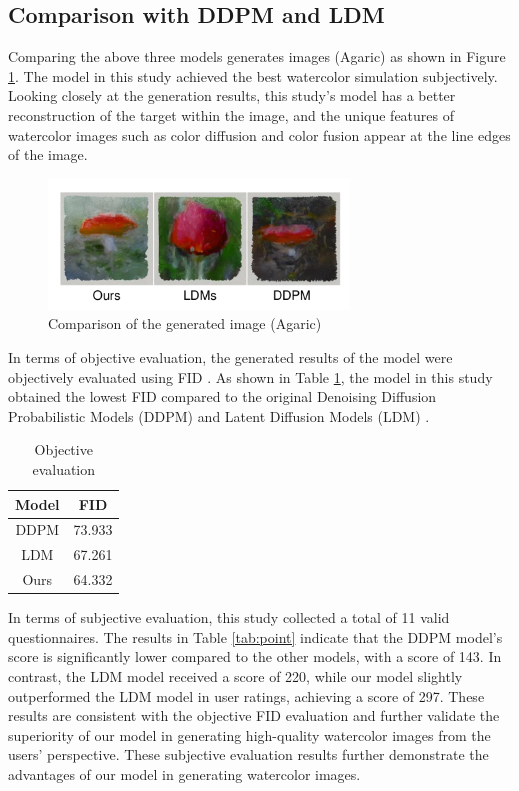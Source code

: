 \documentclass{acsman}
\begin{document}
\subsection{Comparison with DDPM and LDM}
Comparing the above three models generates images (Agaric) as shown in Figure \ref{fig:eva}. The model in this study achieved the best watercolor simulation subjectively. Looking closely at the generation results, this study's model has a better reconstruction of the target within the image, and the unique features of watercolor images such as color diffusion and color fusion appear at the line edges of the image.
\begin{figure}[h]
    \centering
    \includegraphics[width=8cm]{image/eva.pdf}
    \caption{Comparison of the generated image (Agaric)}
    \label{fig:eva}
\end{figure}
In terms of objective evaluation, the generated results of the model were objectively evaluated using FID \cite{FID}. As shown in Table \ref{tab:fid}, the model in this study obtained the lowest FID compared to the original Denoising Diffusion Probabilistic Models (DDPM) \cite{ho2020denoising} and Latent Diffusion Models (LDM) \cite{rombach2022high}.

\begin{table}[htbp]
  \centering
  \caption{Objective evaluation}
  \label{tab:fid}
  \begin{tabular}{c c}
    \hline
    Model & FID  \\
    \hline
    DDPM & 73.933  \\
    LDM & 67.261\\
    Ours & 64.332  \\
    \hline
  \end{tabular}
\end{table}

In terms of subjective evaluation, this study collected a total of 11 valid questionnaires. The results in Table \ref{tab:point} indicate that the DDPM model's score is significantly lower compared to the other models, with a score of 143. In contrast, the LDM model received a score of 220, while our model slightly outperformed the LDM model in user ratings, achieving a score of 297. These results are consistent with the objective FID evaluation and further validate the superiority of our model in generating high-quality watercolor images from the users' perspective. These subjective evaluation results further demonstrate the advantages of our model in generating watercolor images.
\end{document}
